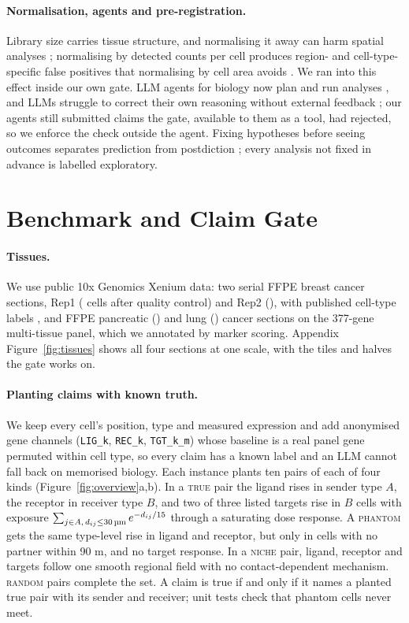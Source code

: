 \documentclass[letterpaper]{article} %
\newcommand{\um}{\ifmmode\,\text{\textmu m}\else\,\textmu m\fi}
\begin{document}
\paragraph{Normalisation, agents and pre-registration.} Library size carries tissue structure, and normalising it away
can harm spatial analyses \cite{bhuva2024}; normalising by detected counts per cell produces region- and
cell-type-specific false positives that normalising by cell area avoids \cite{atta2024}. We ran into this effect inside
our own gate. LLM agents for biology now plan and run analyses
\cite{huang2025biomni,xiao2024cellagent,roohani2024biodiscoveryagent}, and LLMs struggle to correct their own
reasoning without external feedback \cite{huang2023selfcorrect}; our agents still submitted claims the gate, available
to them as a tool, had rejected, so we enforce the check outside the agent. Fixing hypotheses before seeing outcomes
separates prediction from postdiction \cite{nosek2018}; every analysis not fixed in advance is labelled exploratory.

\section{Benchmark and Claim Gate}
\paragraph{Tissues.} We use public 10x Genomics Xenium data: two serial FFPE breast cancer sections, Rep1
(\cellsBreastRepone{} cells after quality control) and Rep2 (\cellsBreastReptwo{}), with published cell-type labels
\cite{janesick2023}, and FFPE pancreatic (\cellsPancreas{}) and lung (\cellsLung{}) cancer sections on the 377-gene
multi-tissue panel, which we annotated by marker scoring. Appendix Figure~\ref{fig:tissues} shows all four sections at
one scale, with the tiles and halves the gate works on.

\paragraph{Planting claims with known truth.} We keep every cell's position, type and measured expression and add
anonymised gene channels (\texttt{LIG\_k}, \texttt{REC\_k}, \texttt{TGT\_k\_m}) whose baseline is a real panel gene
permuted within cell type, so every claim has a known label and an LLM cannot fall back on memorised biology. Each
instance plants ten pairs of each of four kinds (Figure~\ref{fig:overview}a,b). In a \textsc{true} pair the ligand
rises in sender type $A$, the receptor in receiver type $B$, and two of three listed targets rise in $B$ cells with
exposure $\sum_{j\in A,\,d_{ij}\le 30\um} e^{-d_{ij}/15}$ through a saturating dose response. A \textsc{phantom} gets
the same type-level rise in ligand and receptor, but only in cells with no partner within 90\um, and no target
response. In a \textsc{niche} pair, ligand, receptor and targets follow one smooth regional field with no
contact-dependent mechanism. \textsc{random} pairs complete the set. A claim is true if and only if it names a planted
true pair with its sender and receiver; unit tests check that phantom cells never meet.
\end{document}
